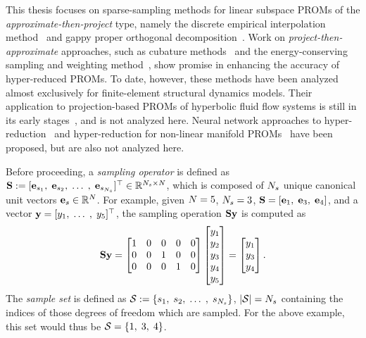 This thesis focuses on sparse-sampling methods for linear subspace PROMs of the \textit{approximate-then-project} type, namely the discrete empirical interpolation method~\cite{Chaturantabut2010} and gappy proper orthogonal decomposition~\cite{Everson1995}. Work on \textit{project-then-approximate} approaches, such as cubature methods~\cite{An2008,Hernandez2017} and the energy-conserving sampling and weighting method~\cite{Farhat2014}, show promise in enhancing the accuracy of hyper-reduced PROMs. To date, however, these methods have been analyzed almost exclusively for finite-element structural dynamics models. Their application to projection-based PROMs of hyperbolic fluid flow systems is still in its early stages~\cite{Grimberg2020Hyper}, and is not analyzed here. Neural network approaches to hyper-reduction~\cite{nnHyperRed} and hyper-reduction for non-linear manifold PROMs~\cite{Kim2022} have been proposed, but are also not analyzed here.

Before proceeding, a \textit{sampling operator} is defined as $\mathbf{S} := [\mathbf{e}_{s_1}, \; \mathbf{e}_{s_2}, \; \hdots \;, \; \mathbf{e}_{s_{N_s}} ]^\top \in \mathbb{R}^{N_s \times N}$, which is composed of $N_s$ unique canonical unit vectors $\mathbf{e}_{s} \in \mathbb{R}^{N}$. For example, given $N = 5$, $N_s = 3$, $\mathbf{S} = [\mathbf{e}_1, \; \mathbf{e}_3, \; \mathbf{e}_4]$,
and a vector $\mathbf{y} = [y_1, \; \hdots \;, \; y_5]^\top$, the sampling operation $\mathbf{S} \mathbf{y}$ is computed as
%
\begin{equation}
	\mathbf{S} \mathbf{y} =
	\begin{bmatrix}
		1 & 0 & 0 & 0 & 0 \\
		0 & 0 & 1 & 0 & 0 \\
		0 & 0 & 0 & 1 & 0 \\
	\end{bmatrix}
	\begin{bmatrix}
		y_1 \\ y_2 \\ y_3 \\ y_4 \\ y_5
	\end{bmatrix} =
	\begin{bmatrix}
		y_1 \\ y_3 \\ y_4
	\end{bmatrix}.
\end{equation}
%
The \textit{sample set} is defined as $\mathcal{S} := \{s_1, \; s_2, \; \hdots \;, \; s_{N_s}\}$, $| \mathcal{S} | = N_s$ containing the indices of those degrees of freedom which are sampled. For the above example, this set would thus be $\mathcal{S} = \{1, \; 3, \; 4\}$.

